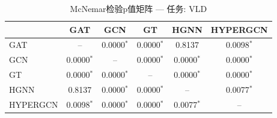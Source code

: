 \begin{table}[htbp]
\centering
\caption{McNemar检验p值矩阵 — 任务: VLD}
\label{tab:mcnemar_VLD}
\begin{tabular}{lccccc}
\toprule
 & GAT & GCN & GT & HGNN & HYPERGCN \\
\midrule
GAT & -- & 0.0000$^*$ & 0.0000$^*$ & 0.8137 & 0.0098$^*$ \\
GCN & 0.0000$^*$ & -- & 0.0000$^*$ & 0.0000$^*$ & 0.0000$^*$ \\
GT & 0.0000$^*$ & 0.0000$^*$ & -- & 0.0000$^*$ & 0.0000$^*$ \\
HGNN & 0.8137 & 0.0000$^*$ & 0.0000$^*$ & -- & 0.0077$^*$ \\
HYPERGCN & 0.0098$^*$ & 0.0000$^*$ & 0.0000$^*$ & 0.0077$^*$ & -- \\
\bottomrule
\end{tabular}
\end{table}